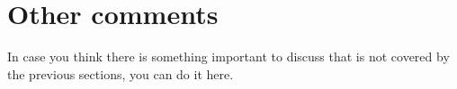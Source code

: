 \documentclass[a4paper,10pt]{article}
\newcommand{\ReplaceMe}[1]{{\color{blue}#1}}
\begin{document}
\section{Other comments} \label{sec_other}

\ReplaceMe{In case you think there is something important to discuss that is not covered by the previous sections, you can do it here. }



\end{document}
